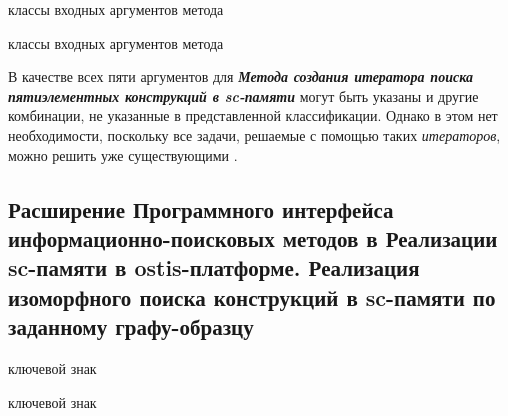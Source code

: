\begin{SCn}
\begin{scnsubstruct}
\begin{scnsubstruct}
\begin{scnindent}
\begin{scnrelfromvector}{классы входных аргументов метода}
	\end{scnrelfromvector}
\end{scnindent}
\begin{scnindent}
	\begin{scnrelfromvector}{классы входных аргументов метода}
	\end{scnrelfromvector}
\end{scnindent}

\end{scnsubstruct}

\end{scnsubstruct}
\end{SCn}

В качестве всех пяти аргументов для \textbf{\textit{Метода создания итератора поиска пятиэлементных конструкций в sc-памяти}} могут быть указаны и другие комбинации, не указанные в представленной классификации. Однако в этом нет необходимости, поскольку все задачи, решаемые с помощью таких \textit{итераторов}, можно решить уже существующими .

\subsection{Расширение Программного интерфейса информационно-поисковых методов в Реализации sc-памяти в ostis-платформе. Реализация изоморфного поиска конструкций в sc-памяти по заданному графу-образцу}
\label{sec_soft_platform_information_retrieval_subsystem_extension}

\begin{SCn}
	
\begin{scnrelfromlist}{ключевой знак}
\end{scnrelfromlist}	
	
\begin{scnrelfromlist}{ключевой знак}
\end{scnrelfromlist}
	
\end{SCn}

